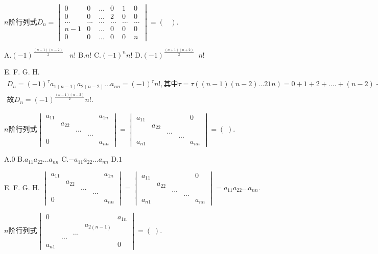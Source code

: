 $n\mathrm{阶行列式}D_n=\begin{vmatrix}0&0&...&0&1&0\\0&0&...&2&0&0\\...&...&...&...&...&...\\n-1&0&...&0&0&0\\0&0&...&0&0&n\end{vmatrix}=(\;\;\;).$

A.$(-1)^\frac{(n-1)(n-2)}2\;\;\;n!$   B.$n!$   C.$(-1)^nn!$   D.$(-1)^\frac{(n+1)(n+2)}2\;\;n!$

E.   F.   G.   H.
$\begin{array}{l}D_n=(-1)^\tau a_{1(n-1)}a_{2(n-2)}...a_{nn}=(-1)^\tau n!,\mathrm{其中}\tau=\tau((n-1)(n-2)...21n)=0+1+2+....+(n-2)+0=\frac{(n-1)(n-2)}2\\故D_n=(-1)^\frac{(n-1)(n-2)}2n!.\end{array}$


$n\mathrm{阶行列式}\begin{vmatrix}a_{11}&&&&a_{1n}\\&a_{22}&&&\\&&...&&\\&&&...&\\0&&&&a_{nn}\end{vmatrix}=\begin{vmatrix}a_{11}&&&&0\\&a_{22}&&&\\&&...&&\\&&&...&\\a_{n1}&&&&a_{nn}\end{vmatrix}=(\;).$

A.$0$   B.$a_{11}a_{22}...a_{nn}$   C.$-a_{11}a_{22}...a_{nn}$   D.$1$

E.   F.   G.   H.
$\begin{vmatrix}a_{11}&&&&a_{1n}\\&a_{22}&&&\\&&...&&\\&&&...&\\0&&&&a_{nn}\end{vmatrix}=\begin{vmatrix}a_{11}&&&&0\\&a_{22}&&&\\&&...&&\\&&&...&\\a_{n1}&&&&a_{nn}\end{vmatrix}=a_{11}a_{22}...a_{nn}.$


$n\mathrm{阶行列式}\begin{vmatrix}0&&&&a_{1n}\\&&&a_{2(n-1)}&\\&&...&&\\&...&&&\\a_{n1}&&&&0\end{vmatrix}=(\;).$

